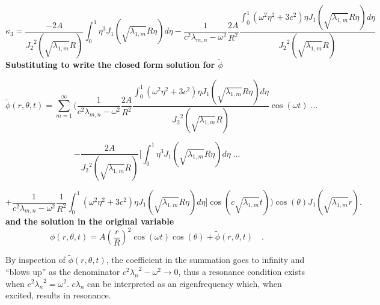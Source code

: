 \documentclass{homework}
\begin{document}
\[ \kappa_3 = \frac{-2A}{{J_2}^2 \left( \sqrt{\lambda_{1,m}} R \right)} \int_0^1 \eta^3 J_1 \left( \sqrt{\lambda_{1,m}} R \eta \right) d \eta - \frac{1}{c^2 \lambda_{m,n} - \omega^2} \frac{2A}{R^2} \frac{\int_0^1 \left( \omega^2 \eta^2 + 3c^2 \right) \eta J_1\left( \sqrt{\lambda_{1,m}} R \eta \right) d\eta }{{J_2}^2 \left( \sqrt{\lambda_{1,m}} R \right)}\]
\noindent
\textbf{Substituting to write the closed form solution for $\tilde{\phi}$}

$$ \tilde{\phi} (r, \theta, t) = \sum_{m=1}^\infty \Biggl( \frac{1}{c^2 \lambda_{m,n} - \omega^2} \frac{2A}{R^2} \frac{\int_0^1 \left( \omega^2 \eta^2 + 3c^2 \right) \eta J_1\left( \sqrt{\lambda_{1,m}} R \eta \right) d\eta }{{J_2}^2 \left( \sqrt{\lambda_{1,m}} R \right)} \cos(\omega t) \; \dots $$

$$ - \frac{2A}{{J_2}^2 \left( \sqrt{\lambda_{1,m}} R \right)}\Bigg[ \int_0^1 \eta^3 J_1 \left( \sqrt{\lambda_{1,m}} R\eta \right) d\eta \; \dots $$

$$ + \frac{1}{c^2 \lambda_{m,n} - \omega^2} \frac{1}{R^2} \int_0^1 \left(\omega^2 \eta^2 + 3c^2 \right) \eta J_1 \left(\sqrt{\lambda_{1,m}} R \eta \right) d\eta \Bigg] \cos \left(c \sqrt{\lambda_{1,m}} t \right) \Biggl) \cos(\theta) J_1 \left(\sqrt{\lambda_{1,m} } r \right) .$$
\noindent
\textbf{and the solution in the original variable}
$$ \phi(r, \theta, t) = A \left(\frac{r}{R} \right)^2 \cos(\omega t) \cos(\theta) + \tilde{\phi} (r, \theta, t) \quad .$$ 

\noindent By inspection of $\tilde{\phi}(r, \theta, t)$, the coefficient in the summation goes to infinity and ``blows up'' as the denominator $c^2 {\lambda_n}^2 - \omega^2 \rightarrow 0$, thus a resonance condition exists when $c^2 {\lambda_n}^2 = \omega^2$. $c \lambda_n$ can be interpreted as an eigenfrequency which, when excited, results in resonance. 
\end{document}

